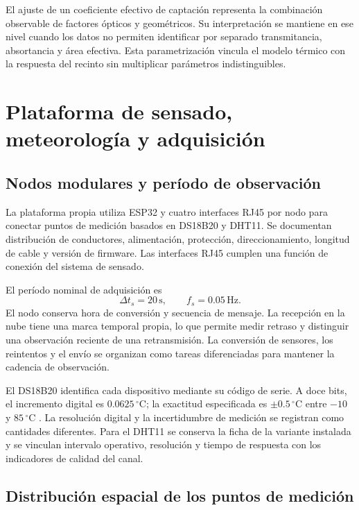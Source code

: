 El ajuste de un coeficiente efectivo de captación representa la combinación observable de factores ópticos y geométricos. Su interpretación se mantiene en ese nivel cuando los datos no permiten identificar por separado transmitancia, absortancia y área efectiva. Esta parametrización vincula el modelo térmico con la respuesta del recinto sin multiplicar parámetros indistinguibles.
\FloatBarrier

\section{Plataforma de sensado, meteorología y adquisición}
\label{met:sensado}

\subsection{Nodos modulares y período de observación}

La plataforma propia utiliza ESP32 y cuatro interfaces RJ45 por nodo para conectar puntos de medición basados en DS18B20 y DHT11. Se documentan distribución de conductores, alimentación, protección, direccionamiento, longitud de cable y versión de firmware. Las interfaces RJ45 cumplen una función de conexión del sistema de sensado.

El período nominal de adquisición es
\begin{equation}
\Delta t_s=20\,\mathrm s,\qquad f_s=0.05\,\mathrm{Hz}.
\label{met:muestreo}
\end{equation}
El nodo conserva hora de conversión y secuencia de mensaje. La recepción en la nube tiene una marca temporal propia, lo que permite medir retraso y distinguir una observación reciente de una retransmisión. La conversión de sensores, los reintentos y el envío se organizan como tareas diferenciadas para mantener la cadencia de observación.

El DS18B20 identifica cada dispositivo mediante su código de serie. A doce bits, el incremento digital es $0.0625\,^{\circ}\mathrm C$; la exactitud especificada es $\pm0.5\,^{\circ}\mathrm C$ entre $-10$ y $85\,^{\circ}\mathrm C$ \cite{ds18b20_2019}. La resolución digital y la incertidumbre de medición se registran como cantidades diferentes. Para el DHT11 se conserva la ficha de la variante instalada y se vinculan intervalo operativo, resolución y tiempo de respuesta con los indicadores de calidad del canal.

\subsection{Distribución espacial de los puntos de medición}

